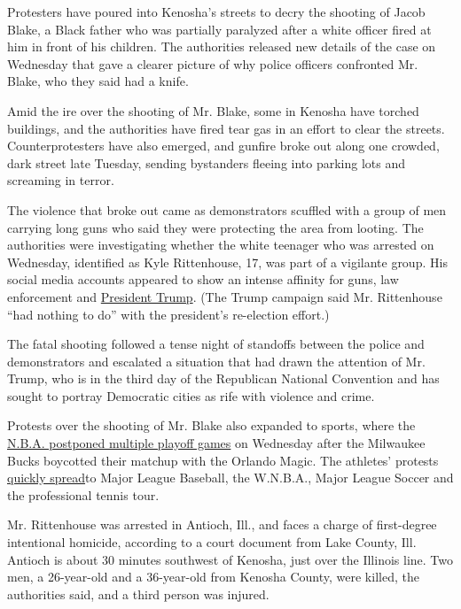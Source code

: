 Protesters have poured into Kenosha's streets to decry the shooting of
Jacob Blake, a Black father who was partially paralyzed after a white
officer fired at him in front of his children. The authorities released
new details of the case on Wednesday that gave a clearer picture of why
police officers confronted Mr. Blake, who they said had a knife.

Amid the ire over the shooting of Mr. Blake, some in Kenosha have
torched buildings, and the authorities have fired tear gas in an effort
to clear the streets. Counterprotesters have also emerged, and gunfire
broke out along one crowded, dark street late Tuesday, sending
bystanders fleeing into parking lots and screaming in terror.

The violence that broke out came as demonstrators scuffled with a group
of men carrying long guns who said they were protecting the area from
looting. The authorities were investigating whether the white teenager
who was arrested on Wednesday, identified as Kyle Rittenhouse, 17, was
part of a vigilante group. His social media accounts appeared to show an
intense affinity for guns, law enforcement and
\href{https://www.buzzfeednews.com/article/ellievhall/kenosha-suspect-kyle-rittenhouse-trump-rally}{President
Trump}. (The Trump campaign said Mr. Rittenhouse ``had nothing to do''
with the president's re-election effort.)

The fatal shooting followed a tense night of standoffs between the
police and demonstrators and escalated a situation that had drawn the
attention of Mr. Trump, who is in the third day of the Republican
National Convention and has sought to portray Democratic cities as rife
with violence and crime.

Protests over the shooting of Mr. Blake also expanded to sports, where
the
\href{https://www.nytimes3xbfgragh.onion/2020/08/26/sports/basketball/nba-boycott-bucks-magic-blake-shooting.html}{N.B.A.
postponed multiple playoff games} on Wednesday after the Milwaukee Bucks
boycotted their matchup with the Orlando Magic. The athletes' protests
\href{https://www.nytimes3xbfgragh.onion/2020/08/26/sports/basketball/nba-boycott-bucks-magic-blake-shooting.html}{quickly
spread}to Major League Baseball, the W.N.B.A., Major League Soccer and
the professional tennis tour.

Mr. Rittenhouse was arrested in Antioch, Ill., and faces a charge of
first-degree intentional homicide, according to a court document from
Lake County, Ill. Antioch is about 30 minutes southwest of Kenosha, just
over the Illinois line. Two men, a 26-year-old and a 36-year-old from
Kenosha County, were killed, the authorities said, and a third person
was injured.

